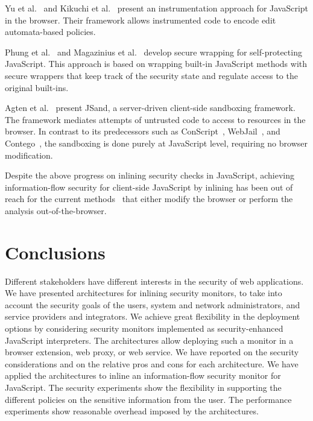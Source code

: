 \documentclass{llncs}
\begin{document}
Yu et al.~\cite{Yu+:POPL07} and Kikuchi et
al.~\cite{DBLP:conf/aplas/2008} present an instrumentation approach
for JavaScript in the browser. Their framework allows instrumented
code to encode edit automata-based policies.

Phung et al.~\cite{DBLP:conf/ccs/PhungSC09} and 
Magazinius et al.~\cite{DBLP:conf/nordsec/MagaziniusPS10} develop
secure wrapping for self-protecting JavaScript. This approach is based
on wrapping built-in JavaScript methods with secure wrappers that
keep track of the security state and regulate access to the original built-ins.  



Agten et al.~\cite{DBLP:conf/acsac/AgtenABPDP12} present JSand, a
server-driven client-side sandboxing framework. The framework mediates
attempts of untrusted code to access to resources in the browser.  
In contrast to its predecessors such as
ConScript~\cite{DBLP:conf/sp/MeyerovichL10}, WebJail~\cite{DBLP:conf/acsac/AckerRDPJ11}, and Contego~\cite{DBLP:conf/trust/LuoD11},
the sandboxing is done purely at JavaScript level, requiring no
browser modification.

Despite the above progress on inlining security checks in JavaScript, achieving
information-flow security for client-side JavaScript by inlining has been out of
reach for the current methods~\cite{Vogt+:NDSS07,DBLP:conf/pldi/ChughMJL09,Yip:Narula:Krohn:Morris:EUROSYS09,Jang+:CCS10,DeGroef+:CCS12}  that either
modify the browser or perform the analysis out-of-the-browser.

\section{Conclusions}
\label{sec:conc}
Different stakeholders have different interests in the security of web
applications. We have presented architectures for inlining security
monitors, to take into account the security goals of the users, system and
network administrators, and service providers and integrators.
%
We achieve great flexibility in the deployment options by considering
security monitors implemented as security-enhanced JavaScript interpreters.
%
The architectures allow deploying such a monitor in a browser
extension, web proxy, or web service.
%
We have reported on the security considerations and on the relative pros and
cons for each architecture.
%
We have applied the architectures to inline an information-flow
security monitor for JavaScript.
%
The security experiments show the
flexibility in supporting the different policies on the sensitive
information from the user. 
%
The performance experiments show reasonable overhead imposed by the
architectures.
\end{document}
